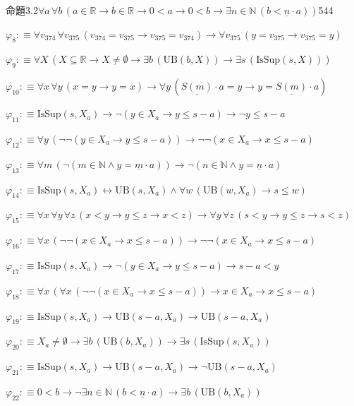 \begin{fullproof}{命題3.2}{$\forall a\,\forall b\,(a \in \mathbb{R} \to b \in \mathbb{R} \to 0 < a \to 0 < b \to \exists n \in \mathbb{N}\,(b < \underline{n} \cdot a))$}{544}
\begin{abbrevlist}
\item $\varphi_{8} :\equiv \forall v_{374}\,\forall v_{375}\,(v_{374} = v_{375} \to v_{375} = v_{374}) \to \forall v_{375}\,(y = v_{375} \to v_{375} = y)$
\item $\varphi_{9} :\equiv \forall X\,(X \subseteq \mathbb{R} \to X \neq \emptyset \to \exists b\,(\mathrm{UB}(b,X)) \to \exists s\,(\mathrm{IsSup}(s,X)))$
\item $\varphi_{10} :\equiv \forall x\,\forall y\,(x = y \to y = x) \to \forall y\,(\underline{S(m)} \cdot a = y \to y = \underline{S(m)} \cdot a)$
\item $\varphi_{11} :\equiv \mathrm{IsSup}(s,X_{a}) \to \neg (y \in X_{a} \to y \leq s - a) \to \neg y \leq s - a$
\item $\varphi_{12} :\equiv \forall y\,(\neg \neg (y \in X_{a} \to y \leq s - a)) \to \neg \neg (x \in X_{a} \to x \leq s - a)$
\item $\varphi_{13} :\equiv \forall m\,(\neg (m \in \mathbb{N} \land y = \underline{m} \cdot a)) \to \neg (n \in \mathbb{N} \land y = \underline{n} \cdot a)$
\item $\varphi_{14} :\equiv \mathrm{IsSup}(s,X_{a}) \leftrightarrow \mathrm{UB}(s,X_{a}) \land \forall w\,(\mathrm{UB}(w,X_{a}) \to s \leq w)$
\item $\varphi_{15} :\equiv \forall x\,\forall y\,\forall z\,(x < y \to y \leq z \to x < z) \to \forall y\,\forall z\,(s < y \to y \leq z \to s < z)$
\item $\varphi_{16} :\equiv \forall x\,(\neg \neg (x \in X_{a} \to x \leq s - a)) \to \neg \neg (x \in X_{a} \to x \leq s - a)$
\item $\varphi_{17} :\equiv \mathrm{IsSup}(s,X_{a}) \to \neg (y \in X_{a} \to y \leq s - a) \to s - a < y$
\item $\varphi_{18} :\equiv \forall x\,(\forall x\,(\neg \neg (x \in X_{a} \to x \leq s - a)) \to x \in X_{a} \to x \leq s - a)$
\item $\varphi_{19} :\equiv \mathrm{IsSup}(s,X_{a}) \to \mathrm{UB}(s - a,X_{a}) \to \mathrm{UB}(s - a,X_{a})$
\item $\varphi_{20} :\equiv X_{a} \neq \emptyset \to \exists b\,(\mathrm{UB}(b,X_{a})) \to \exists s\,(\mathrm{IsSup}(s,X_{a}))$
\item $\varphi_{21} :\equiv \mathrm{IsSup}(s,X_{a}) \to \mathrm{UB}(s - a,X_{a}) \to \neg \mathrm{UB}(s - a,X_{a})$
\item $\varphi_{22} :\equiv 0 < b \to \neg \exists n \in \mathbb{N}\,(b < \underline{n} \cdot a) \to \exists b\,(\mathrm{UB}(b,X_{a}))$

\end{abbrevlist}
\end{fullproof}
